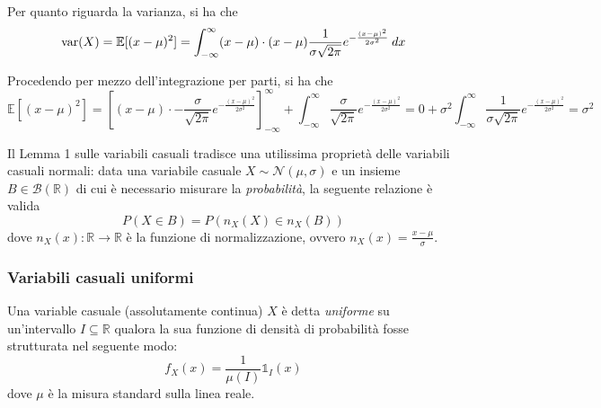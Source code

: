                 Per quanto riguarda la varianza, si ha che
                \[
                    \textnormal{var}(X) = \mathbb{E}[(x - \mu)^{2}] = \int_{-\infty}^{\infty} (x - \mu) \cdot (x - \mu) \frac{1}{\sigma \sqrt{2 \pi}} e^{- \frac{(x - \mu)^{2}}{2 \sigma^{2}}} \: dx
                \]

                Procedendo per mezzo dell'integrazione per parti, si ha che
                \[
                    \mathbb{E}[(x - \mu)^{2}] = \left[(x - \mu) \cdot - \frac{\sigma}{\sqrt{2 \pi}} e^{-\frac{(x - \mu)^{2}}{2 \sigma^{2}}}\right]^{\infty}_{-\infty} + \int_{-\infty}^{\infty} \frac{\sigma}{\sqrt{2 \pi}} e^{-\frac{(x - \mu)^{2}}{2 \sigma^{2}}} =
                    0 + \sigma^{2} \int_{-\infty}^{\infty} \frac{1}{\sigma \sqrt{2 \pi}} e^{-\frac{(x - \mu)^{2}}{2 \sigma^{2}}} =
                    \sigma^{2}
                \]

                Il Lemma 1 sulle variabili casuali tradisce una utilissima proprietà delle variabili casuali normali: data una variabile casuale $X \sim \mathcal{N}(\mu, \sigma)$ e un insieme $B \in \mathcal{B}(\mathbb{R})$ di cui è necessario misurare la \textit{probabilità}, la seguente relazione è valida
                \[
                    P(X \in B) = P(n_{X}(X) \in n_{X}(B))
                \]
                dove $n_{X}(x): \mathbb{R} \rightarrow \mathbb{R}$ è la funzione di normalizzazione, ovvero $n_{X}(x) = \frac{x - \mu}{\sigma}$.

            \subsubsection{Variabili casuali uniformi}
                Una variable casuale (assolutamente continua) $X$ è detta \textit{uniforme} su un'intervallo $I \subseteq \mathbb{R}$ qualora la sua funzione di densità di probabilità fosse strutturata nel seguente modo:
                \[
                    f_{X}(x) = \frac{1}{\mu(I)} \mathds{1}_{I}(x)
                \]
                dove $\mu$ è la misura standard sulla linea reale.

